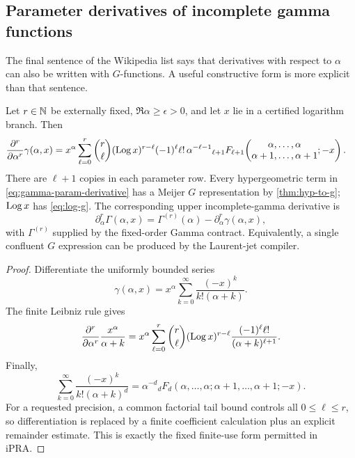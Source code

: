 \subsection{Parameter derivatives of incomplete gamma functions}

The final sentence of the Wikipedia list says that derivatives with respect to
$\alpha$ can also be written with $G$-functions.  A useful constructive form is
more explicit than that sentence.

\begin{theorem}\label{thm:gamma-parameter-derivatives}
Let $r\in\mathbb N$ be externally fixed, $\Re\alpha\ge\epsilon>0$, and let $x$ lie in
a certified logarithm branch.  Then
\begin{align}
 \frac{\partial^r}{\partial\alpha^r}\gamma(\alpha,x)
 &=x^\alpha\sum_{\ell=0}^{r}
 \binom{r}{\ell}(\operatorname{Log} x)^{r-\ell}(-1)^\ell\ell!\,
 \alpha^{-\ell-1}
 {}_{\ell+1}F_{\ell+1}\!\left(
 \begin{matrix}\alpha,\ldots,\alpha\\
 \alpha+1,\ldots,\alpha+1\end{matrix};-x\right).
 \label{eq:gamma-param-derivative}
\end{align}
There are $\ell+1$ copies in each parameter row.  Every hypergeometric term in
\eqref{eq:gamma-param-derivative} has a Meijer $G$ representation by
\cref{thm:hyp-to-g}; $\operatorname{Log} x$ has \eqref{eq:log-g}.  The corresponding upper
incomplete-gamma derivative is
\[
 \partial_\alpha^r\Gamma(\alpha,x)
 =\Gamma^{(r)}(\alpha)-\partial_\alpha^r\gamma(\alpha,x),
\]
with $\Gamma^{(r)}$ supplied by the fixed-order Gamma contract.  Equivalently,
a single confluent $G$ expression can be produced by the Laurent-jet compiler.
\end{theorem}
\begin{proof}
Differentiate the uniformly bounded series
\[
 \gamma(\alpha,x)=x^\alpha\sum_{k=0}^\infty
 \frac{(-x)^k}{k!(\alpha+k)}.
\]
The finite Leibniz rule gives
\[
 \frac{\partial^r}{\partial\alpha^r}
 \frac{x^\alpha}{\alpha+k}
 =x^\alpha\sum_{\ell=0}^{r}\binom{r}{\ell}
 (\operatorname{Log} x)^{r-\ell}\frac{(-1)^\ell\ell!}{(\alpha+k)^{\ell+1}}.
\]
Finally,
\[
 \sum_{k=0}^\infty\frac{(-x)^k}{k!(\alpha+k)^d}
 =\alpha^{-d}{}_dF_d(\alpha,\ldots,\alpha;
                    \alpha+1,\ldots,\alpha+1;-x).
\]
For a requested precision, a common factorial tail bound controls all
$0\le\ell\le r$, so differentiation is replaced by a finite coefficient
calculation plus an explicit remainder estimate.  This is exactly the fixed
finite-use form permitted in iPRA.
\end{proof}

